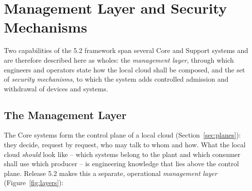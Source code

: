 \documentclass[a4paper]{arrowhead}
\newcommand{\sys}[1]{\textcolor{ArrowheadBlue}{\textbf{\ahbreak{#1}}}}      %
\begin{document}
\newpage

\FloatBarrier





\section{Management Layer and Security Mechanisms}
\label{sec:mgmtsec}

Two capabilities of the 5.2 framework span several Core and Support systems and are therefore
described here as wholes: the \emph{management layer}, through which engineers and operators state
how the local cloud shall be composed, and the set of \emph{security mechanisms}, to which the
\sys{Onboarding} system adds controlled admission and withdrawal of devices and systems.

\subsection{The Management Layer}
\label{sec:mgmt}

The Core systems form the control plane of a local cloud (Section~\ref{sec:planes}): they decide,
request by request, who may talk to whom and how. What the local cloud \emph{should} look like --
which systems belong to the plant and which consumer shall use which producer -- is engineering
knowledge that lies above the control plane. Release 5.2 makes this a separate, operational
\emph{management layer} (Figure~\ref{fig:layers}):
\end{document}

